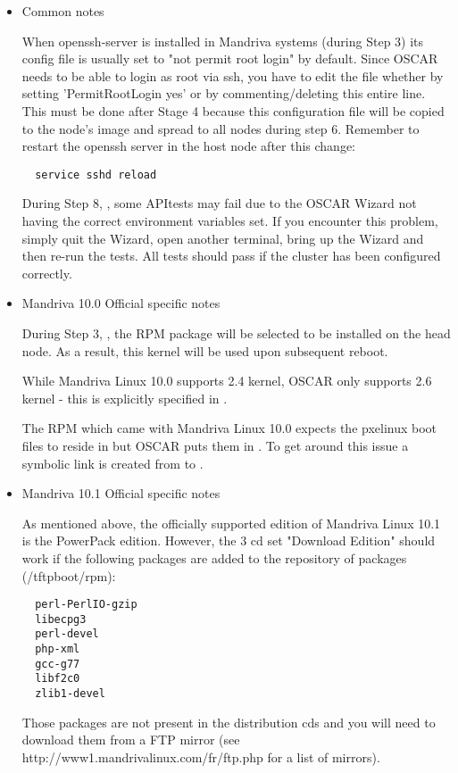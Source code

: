 \begin{itemize}

\item Common notes

When openssh-server is installed in Mandriva systems (during Step 3)
its config file is usually set to "not permit root login" by default.
Since OSCAR needs to be able to login as root via ssh, you have to edit the
file  whether by setting 
'PermitRootLogin yes' or by commenting/deleting this entire line. This must 
be done after Stage 4 because this configuration file will be copied to the 
node's image and spread to all nodes during step 6. Remember to restart
the openssh server in the host node after this change:
\begin{verbatim}
  service sshd reload
\end{verbatim}

During Step 8, , some APItests may fail due to
the OSCAR Wizard not having the correct environment variables set.  If you
encounter this problem, simply quit the Wizard, open another terminal,
bring up the Wizard and then re-run the tests.  All tests should pass if
the cluster has been configured correctly.


\item Mandriva 10.0 Official specific notes

During Step 3, , the RPM package
 will be selected to be installed on the head node.
As a result, this kernel will be used upon subsequent reboot.

While Mandriva Linux 10.0 supports 2.4 kernel, OSCAR only supports
2.6 kernel - this is explicitly specified in
.

The  RPM which came with Mandriva Linux 10.0 expects the
pxelinux boot files to reside in  but OSCAR puts
them in .  To get around this issue a symbolic link is
created from  to .


\item Mandriva 10.1 Official specific notes

As mentioned above, the officially supported edition of Mandriva Linux 10.1
is the PowerPack edition. However, the 3 cd set "Download Edition"
should work if the following packages are added to the repository of 
packages (/tftpboot/rpm):
\begin{verbatim}
  perl-PerlIO-gzip
  libecpg3
  perl-devel
  php-xml
  gcc-g77
  libf2c0
  zlib1-devel
\end{verbatim} 
Those packages are not present in the distribution cds and you will need to
download them from a FTP mirror (see http://www1.mandrivalinux.com/fr/ftp.php
for a list of mirrors).


\end{itemize}
